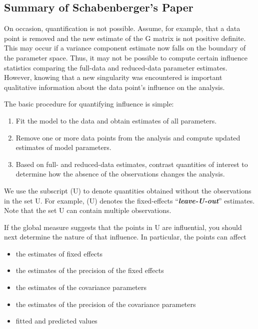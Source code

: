 \documentclass[12pt, a4paper]{article}
\begin{document}
\subsection{Summary of Schabenberger's Paper}

On occasion, quantification is not possible. Assume, for example, that a data point is removed
and the new estimate of the G matrix is not positive definite. This may occur if a variance component
estimate now falls on the boundary of the parameter space. Thus, it may not be possible to compute certain
influence statistics comparing the full-data and reduced-data parameter estimates. However, knowing that
a new singularity was encountered is important qualitative information about the data point’s influence on
the analysis.

The basic procedure for quantifying influence is simple:

\begin{enumerate}
	\item Fit the model to the data and obtain estimates of all parameters.
	\item Remove one or more data points from the analysis and compute updated estimates of model parameters.
	\item Based on full- and reduced-data estimates, contrast quantities of interest to determine how the absence
	of the observations changes the analysis.
\end{enumerate}
We use the subscript (U) to denote quantities obtained without the observations in the set U. For example,
(U) denotes the fixed-effects “\textit{\textbf{leave-U-out}}” estimates. Note that the set U can contain multiple observations.


If the global measure suggests that the points in U are influential, you should next determine the nature of
that influence. In particular, the points can affect
\begin{itemize}
	\item the estimates of fixed effects
	\item the estimates of the precision of the fixed effects
	\item the estimates of the covariance parameters
	\item the estimates of the precision of the covariance parameters
	\item fitted and predicted values
\end{itemize}
\end{document}
